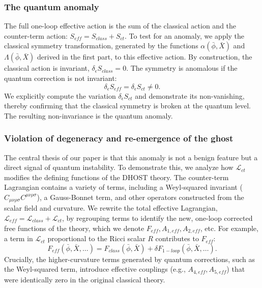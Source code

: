 \documentclass[twocolumn]{aastex631}
\begin{document}
\subsubsection{The quantum anomaly}
The full one-loop effective action is the sum of the classical action and the counter-term action: $S_{eff} = S_{class} + S_{ct}$. To test for an anomaly, we apply the classical symmetry transformation, generated by the functions $\alpha(\bar{\phi}, \bar{X})$ and $\Lambda(\bar{\phi}, \bar{X})$ derived in the first part, to this effective action. By construction, the classical action is invariant, $\delta_\epsilon S_{class} = 0$. The symmetry is anomalous if the quantum correction is not invariant:
\begin{equation}
    \delta_\epsilon S_{eff} = \delta_\epsilon S_{ct} \neq 0.
\end{equation}
We explicitly compute the variation $\delta_\epsilon S_{ct}$ and demonstrate its non-vanishing, thereby confirming that the classical symmetry is broken at the quantum level. The resulting non-invariance is the quantum anomaly.

\subsubsection{Violation of degeneracy and re-emergence of the ghost}
The central thesis of our paper is that this anomaly is not a benign feature but a direct signal of quantum instability. To demonstrate this, we analyze how $\mathcal{L}_{ct}$ modifies the defining functions of the DHOST theory. The counter-term Lagrangian contains a variety of terms, including a Weyl-squared invariant ($C_{\mu\nu\rho\sigma}C^{\mu\nu\rho\sigma}$), a Gauss-Bonnet term, and other operators constructed from the scalar field and curvature. We rewrite the total effective Lagrangian, $\mathcal{L}_{eff} = \mathcal{L}_{class} + \mathcal{L}_{ct}$, by regrouping terms to identify the new, one-loop corrected free functions of the theory, which we denote $F_{eff}, A_{1,eff}, A_{2,eff}$, etc. For example, a term in $\mathcal{L}_{ct}$ proportional to the Ricci scalar $R$ contributes to $F_{eff}$:
\begin{equation}
    F_{eff}(\bar{\phi}, \bar{X}, \dots) = F_{class}(\bar{\phi}, \bar{X}) + \delta F_{1-loop}(\bar{\phi}, \bar{X}, \dots).
\end{equation}
Crucially, the higher-curvature terms generated by quantum corrections, such as the Weyl-squared term, introduce effective couplings (e.g., $A_{4,eff}, A_{5,eff}$) that were identically zero in the original classical theory.
\end{document}
